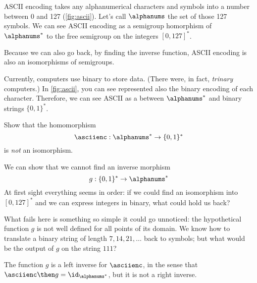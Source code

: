 \begin{example}
    ASCII encoding takes any alphanumerical characters and symbols into a number between 0 and 127 (\cref{fig:ascii}).
    Let's call $\alphanums$ the set of those 127 symbols.
    We can see ASCII encoding as a semigroup homorphism of $\alphanums^*$ to the free semigroup on the integers $[0,127]^*$.

    Because we can also go back, by finding the inverse function, ASCII encoding is also an isomorphisms of semigroups.
\end{example}
\begin{example}
    Currently, computers use binary to store data. (There were, in fact, \emph{trinary} computers.)
    In \cref{fig:ascii}, you can see represented also the binary encoding of each character.
    Therefore, we can see ASCII as a \whomo between $\alphanums^*$ and binary strings $\{0,1\}^*$.
\end{example}
\begin{exercise}
Show that the homomorphism
\begin{equation}
\asciienc: \alphanums^* \to \{0,1\}^*
 \end{equation}
 is \emph{not} an isomorphism.
\end{exercise}
\begin{solution}
We can show that we cannot find an inverse morphism
 \begin{equation}
 g:  \{0,1\}^* \to \alphanums^*
 \end{equation}
 At first sight everything seems in order: if we could find an isomorphism into $[0,127]^*$ and
 we can express integers in binary, what could hold us back?

What fails here is something so simple it could go unnoticed: the hypothetical function $g$ is not well defined for all points of its domain. We know how to translate a binary string of length $7,14,21,\dots$ back to symbols; but what would be the output of $g$ on the string $111$?

The function $g$ is a left inverse for $\asciienc$, in the sense that
$\asciienc\then g = \id_{\alphanums^*}$, but it is not a right inverse.

\end{solution}

